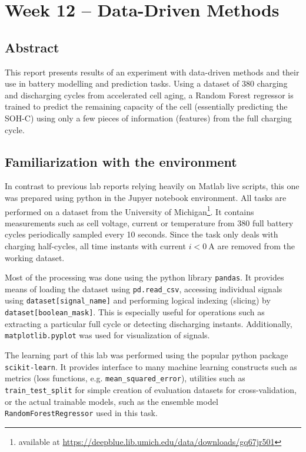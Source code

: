 \chapter{Week 12 -- Data-Driven Methods}

\section{Abstract}
This report presents results of an experiment with data-driven methods and their use in battery modelling and prediction tasks. Using a dataset of 380 charging and discharging cycles from accelerated cell aging, a Random Forest regressor is trained to predict the remaining capacity of the cell (essentially predicting the SOH-C) using only a few pieces of information (features) from the full charging cycle.

\section{Familiarization with the environment}

In contrast to previous lab reports relying heavily on Matlab live scripts, this one was prepared using python in the Jupyer notebook environment. All tasks are performed on a dataset from the University of Michigan\footnote{available at \url{https://deepblue.lib.umich.edu/data/downloads/gq67jr501}}. It contains measurements such as cell voltage, current or temperature from 380 full battery cycles periodically sampled every 10 seconds. Since the task only deals with charging half-cycles, all time instants with current $i < \SI{0}{\ampere}$ are removed from the working dataset.

Most of the processing was done using the python library \texttt{pandas}. It provides means of loading the dataset using \texttt{pd.read\_csv}, accessing individual signals using \texttt{dataset[signal\_name]} and performing logical indexing (slicing) by \texttt{dataset[boolean\_mask]}. This is especially useful for operations such as extracting a particular full cycle or detecting discharging instants. Additionally, \texttt{matplotlib.pyplot} was used for visualization of signals.

The learning part of this lab was performed using the popular python package \texttt{scikit-learn}. It provides interface to many machine learning constructs such as metrics (loss functions, e.g. \texttt{mean\_squared\_error}), utilities such as \texttt{train\_test\_split} for simple creation of evaluation datasets for cross-validation, or the actual trainable models, such as the ensemble model \texttt{RandomForestRegressor} used in this task. 

